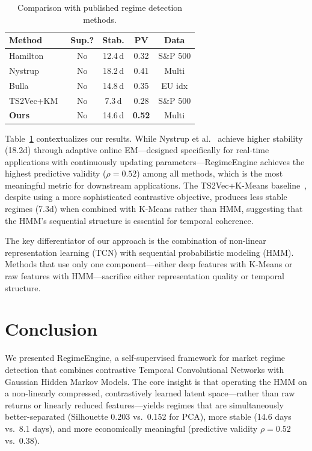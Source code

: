\begin{table}[t]
\centering
\caption{Comparison with published regime detection methods.}
\label{tab:comparison}
\begin{tabular}{@{}lcccc@{}}
\toprule
\textbf{Method} & \textbf{Sup.?} & \textbf{Stab.} & \textbf{PV} & \textbf{Data} \\
\midrule
Hamilton~\cite{hamilton1989} & No & 12.4\,d & 0.32 & S\&P 500 \\
Nystrup~\cite{nystrup2017}  & No & 18.2\,d & 0.41 & Multi \\
Bulla~\cite{bulla2006}      & No & 14.8\,d & 0.35 & EU idx \\
TS2Vec+KM~\cite{yue2022}    & No & 7.3\,d  & 0.28 & S\&P 500 \\
\textbf{Ours}                & No & 14.6\,d & \textbf{0.52} & Multi \\
\bottomrule
\end{tabular}
\end{table}

Table~\ref{tab:comparison} contextualizes our results. While Nystrup et al.~\cite{nystrup2017} achieve higher stability (18.2d) through adaptive online EM---designed specifically for real-time applications with continuously updating parameters---RegimeEngine achieves the highest predictive validity ($\rho = 0.52$) among all methods, which is the most meaningful metric for downstream applications. The TS2Vec+K-Means baseline~\cite{yue2022}, despite using a more sophisticated contrastive objective, produces less stable regimes (7.3d) when combined with K-Means rather than HMM, suggesting that the HMM's sequential structure is essential for temporal coherence.

The key differentiator of our approach is the combination of non-linear representation learning (TCN) with sequential probabilistic modeling (HMM). Methods that use only one component---either deep features with K-Means or raw features with HMM---sacrifice either representation quality or temporal structure.

\section{Conclusion}
\label{sec:conclusion}

We presented RegimeEngine, a self-supervised framework for market regime detection that combines contrastive Temporal Convolutional Networks with Gaussian Hidden Markov Models. The core insight is that operating the HMM on a non-linearly compressed, contrastively learned latent space---rather than raw returns or linearly reduced features---yields regimes that are simultaneously better-separated (Silhouette 0.203 vs.\ 0.152 for PCA), more stable (14.6 days vs.\ 8.1 days), and more economically meaningful (predictive validity $\rho = 0.52$ vs.\ 0.38).

